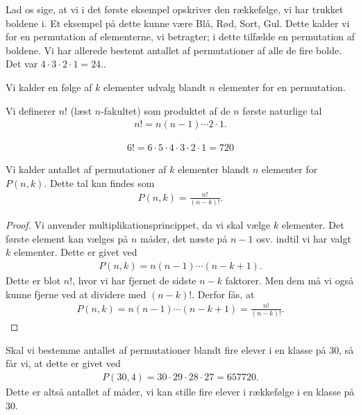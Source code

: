 \begin{exa}
Lad os sige, at vi i det første eksempel opskriver den rækkefølge, vi har trukket boldene i. Et eksempel på dette kunne være Blå, Rød, Sort, Gul. Dette kalder vi for en permutation af elementerne, vi betragter; i dette tilfælde en permutation af boldene. Vi har allerede bestemt antallet af permutationer af alle de fire bolde. Det var $4\cdot 3\cdot 2\cdot 1 = 24.$.
\end{exa}
\begin{defn}[Permutationer]
Vi kalder en følge af $k$ elementer udvalg blandt $n$ elementer for en permutation.
\end{defn}

\begin{defn}[Fakultet]
Vi definerer $n!$ (læst $n$-fakultet) som produktet af de $n$ første naturlige tal
\begin{align*}
n! = n(n-1)\cdots 2\cdot 1.
\end{align*}
\end{defn}


\begin{exa}
	\begin{align*}
		6! = 6 \cdot 5 \cdot 4 \cdot 3 \cdot 2 \cdot 1 = 720
	\end{align*}
\end{exa}

\begin{setn}
	Vi kalder antallet af permutationer af $k$ elementer blandt $n$ elementer for $P(n,k)$. Dette tal kan findes som
	\begin{align*}
		P(n,k) = \frac{n!}{(n-k)!}.
	\end{align*}
\end{setn}

\begin{proof}
	Vi anvender multiplikationsprincippet, da vi skal vælge $k$ elementer. Det første element kan vælges på $n$ måder, det næste på $n-1$ osv. indtil vi har valgt $k$ elementer. Dette er givet ved
		\begin{align*}
			P(n,k) = n(n-1) \cdots (n-k+1).
		\end{align*}
	Dette er blot $n!$, hvor vi har fjernet de sidste $n-k$ faktorer. Men dem må vi også kunne fjerne ved at dividere med $(n-k)!.$ Derfor fås, at 
	\begin{align*}
		P(n,k) = n(n-1) \cdots (n-k+1) = \frac{n!}{(n-k)!}.
	\end{align*}
\end{proof}

\begin{exa}
	Skal vi bestemme antallet af permutationer blandt fire elever i en klasse på 30, så får vi, at dette er givet ved
	\begin{align*}
		P(30,4) = 30\cdot 29 \cdot 28 \cdot 27 = 657720.
	\end{align*}
	Dette er altså antallet af måder, vi kan stille fire elever i rækkefølge i en klasse på 30. 
\end{exa}


